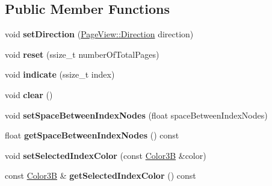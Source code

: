 \subsection*{Public Member Functions}
\begin{DoxyCompactItemize}
\item 
\mbox{\label{classui_1_1PageViewIndicator_ad4aaec1d2afb2b76bc4d59fe417068d8}} 
void {\bfseries set\+Direction} (\hyperlink{classui_1_1ScrollView_aed2d778ae8098dcafe323b2beae8dd6b}{Page\+View\+::\+Direction} direction)
\item 
\mbox{\label{classui_1_1PageViewIndicator_abd55dcfbdadd620d02676c1de612204a}} 
void {\bfseries reset} (ssize\+\_\+t number\+Of\+Total\+Pages)
\item 
\mbox{\label{classui_1_1PageViewIndicator_af6300de4ef26a8ce599216519e2f4b69}} 
void {\bfseries indicate} (ssize\+\_\+t index)
\item 
\mbox{\label{classui_1_1PageViewIndicator_ab4f83cfb53a3d842637ff25bc21f4fd3}} 
void {\bfseries clear} ()
\item 
\mbox{\label{classui_1_1PageViewIndicator_a3342a8e395ef653cb608672263a73abc}} 
void {\bfseries set\+Space\+Between\+Index\+Nodes} (float space\+Between\+Index\+Nodes)
\item 
\mbox{\label{classui_1_1PageViewIndicator_af39a3ced3158146467d3735406cd46a1}} 
float {\bfseries get\+Space\+Between\+Index\+Nodes} () const
\item 
\mbox{\label{classui_1_1PageViewIndicator_af942935ddf0ab349958502321c4fad36}} 
void {\bfseries set\+Selected\+Index\+Color} (const \hyperlink{structColor3B}{Color3B} \&color)
\item 
\mbox{\label{classui_1_1PageViewIndicator_a6cf78bca571bafababb16cf38dc28362}} 
const \hyperlink{structColor3B}{Color3B} \& {\bfseries get\+Selected\+Index\+Color} () const
\item 
\mbox{\label{classui_1_1PageViewIndicator_a1c305b6412c091e80767304a2f6002c7}} 

\end{DoxyCompactItemize}
